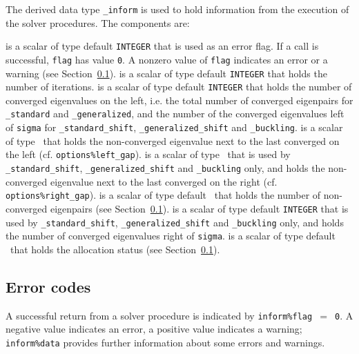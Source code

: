 The derived data type {\tt \solver\_inform} is used
to hold information from the execution of
the solver procedures.
The components are:

\begin{description}
%
 is a scalar of type default {\tt INTEGER} 
that is used as an error flag.
If a call is successful, {\tt flag} has value {\tt 0}.
A nonzero value of {\tt flag} indicates an error or a warning
(see Section~\ref{sec:err}).
%
 is a scalar of type default {\tt INTEGER} that holds 
the number of iterations.
%
is a scalar of type default {\tt INTEGER} that holds
the number of converged eigenvalues on the left,
i.e. the total number of converged eigenpairs for 
{\tt \solver\_standard} and {\tt \solver\_generalized},
and the number of the converged eigenvalues left of {\tt sigma}
for {\tt \solver\_standard\_shift}, {\tt \solver\_generalized\_shift}
and {\tt \solver\_buckling}.
%
is a scalar of type \REALDP\ that holds
the non-converged eigenvalue next to the last converged on the left
(cf. {\tt options\%left\_gap}).
%
is a scalar of type \REALDP\ that is used by
{\tt \solver\_standard\_shift}, {\tt \solver\_generalized\_shift}
and {\tt \solver\_buckling} only, and holds
the non-converged eigenvalue next to the last converged on the right
(cf. {\tt options\%right\_gap}).
%
is a scalar of type default \Integer\ 
that holds the number of non-converged eigenpairs
(see Section~\ref{sec:err}).
%
is a scalar of type default {\tt INTEGER} that is used by 
{\tt \solver\_standard\_shift}, {\tt \solver\_generalized\_shift}
and {\tt \solver\_buckling} only, and holds
the number of converged eigenvalues right of {\tt sigma}.
%
is a scalar of type default \Integer\ 
that holds the allocation status
(see Section~\ref{sec:err}).
%
\end{description}

\subsection{Error codes}

\label{sec:err}

A successful return from 
a solver procedure
is indicated 
by {\tt inform\%flag $=$ 0}.
A negative value indicates an error, a positive value indicates a warning;
{\tt inform\%data} provides further information
about some errors and warnings. 

